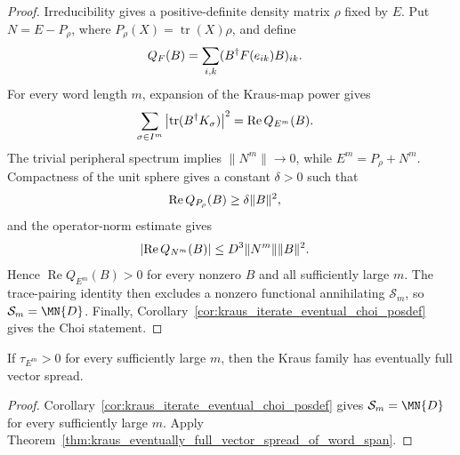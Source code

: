 \begin{proof}
    \leanok
    Irreducibility gives a positive-definite density matrix $\rho$ fixed by
    $E$. Put $N=E-P_\rho$, where
    $P_\rho(X)=\operatorname{tr}(X)\rho$, and define
    \begin{align}
        Q_F(B)&=\sum_{i,k}(B^\dagger F(e_{ik})B)_{ik}.
        \notag
    \end{align}
    For every word length $m$, expansion of the Kraus-map power gives
    \begin{align}
        \sum_{\sigma\in I^m}
        \left|\operatorname{tr}(B^\dagger K_\sigma)\right|^2
        &=\operatorname{Re}Q_{E^m}(B).
        \notag
    \end{align}
    The trivial peripheral spectrum implies $\lVert N^m\rVert\to0$, while
    $E^m=P_\rho+N^m$. Compactness of the unit sphere gives a constant
    $\delta>0$ such that
    \begin{align}
        \operatorname{Re}Q_{P_\rho}(B)&\geq
        \delta\lVert B\rVert^2,
        \notag
    \end{align}
    and the operator-norm estimate gives
    \begin{align}
        \left|\operatorname{Re}Q_{N^m}(B)\right|&\leq
        D^3\lVert N^m\rVert\lVert B\rVert^2.
        \notag
    \end{align}
    Hence $\operatorname{Re}Q_{E^m}(B)>0$ for every nonzero $B$ and all
    sufficiently large $m$. The trace-pairing identity then excludes a
    nonzero functional annihilating $\mathcal S_m$, so
    $\mathcal S_m=\MN{D}$. Finally,
    Corollary~\ref{cor:kraus_iterate_eventual_choi_posdef} gives the Choi
    statement.
\end{proof}

\begin{theorem}
    \label{thm:kraus_eventually_full_vector_spread_of_choi_posdef}
    \leanok
    If $\tau_{E^m}>0$ for every sufficiently large $m$, then the Kraus family
    has eventually full vector spread.
\end{theorem}

\begin{proof}
    \leanok
    Corollary~\ref{cor:kraus_iterate_eventual_choi_posdef} gives
    $\mathcal S_m=\MN{D}$ for every sufficiently large $m$. Apply
    Theorem~\ref{thm:kraus_eventually_full_vector_spread_of_word_span}.
\end{proof}
